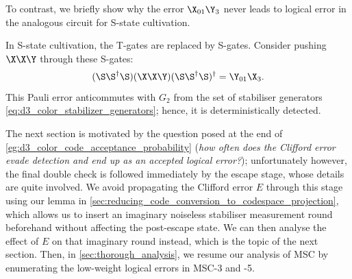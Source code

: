 To contrast,
we briefly show why the error $\X_{0 1} \Y_3$
never leads to logical error in the analogous circuit for S-state cultivation.
\begin{eg}
\label{eg:d3_color_code_s_state}
In S-state cultivation,
the T-gates are replaced by S-gates.
Consider pushing $\X\X\Y$ through these S-gates:
\begin{equation}
	(\S\S^\dag \S) (\X\X\Y)(\S\S^\dag \S)^\dag
	=\Y_{0 1} \X_3.
\end{equation}
This Pauli error anticommutes with $G_2$
from the set of stabiliser generators
\cref{eq:d3_color_stabilizer_generators};
hence, it is deterministically detected.
\end{eg}

The next section is motivated by
the question posed at the end of
\cref{eg:d3_color_code_acceptance_probability}
(\textit{how often does the Clifford error evade detection
and end up as an accepted logical error?});
unfortunately however,
the final double check is followed immediately by the escape stage,
whose details are quite involved.
We avoid propagating the Clifford error $E$ through this stage
using our lemma in \cref{sec:reducing_code_conversion_to_codespace_projection},
which allows us to insert
an imaginary noiseless stabiliser measurement round beforehand
without affecting the post-escape state.
We can then analyse the effect of $E$ on that imaginary round instead,
which is the topic of the next section.
Then, in \cref{sec:thorough_analysis},
we resume our analysis of MSC
by enumerating the low-weight logical errors
in MSC-3 and -5.